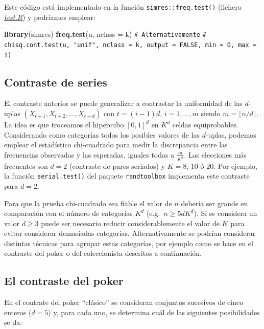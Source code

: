 \documentclass[
  spanish,
  10pt,
]{book}
\newenvironment{Shaded}{\begin{snugshade}}{\end{snugshade}}
\newcommand{\AttributeTok}[1]{\textcolor[rgb]{0.13,0.29,0.53}{#1}}
\newcommand{\CommentTok}[1]{\textcolor[rgb]{0.56,0.35,0.01}{\textit{#1}}}
\newcommand{\FunctionTok}[1]{\textcolor[rgb]{0.13,0.29,0.53}{\textbf{#1}}}
\newcommand{\NormalTok}[1]{#1}
\theoremstyle{break}
\theoremstyle{nonumberplain}
\renewcommand{\CommentTok}[1]{\textcolor[rgb]{0.41,0.41,0.41}{\texttt{#1}}}
\begin{document}
Este código está implementado en la función \texttt{simres::freq.test()} (fichero \href{R/test.R}{\emph{test.R}}) y podríamos emplear:

\begin{Shaded}
\begin{Highlighting}[]
\FunctionTok{library}\NormalTok{(simres)}
\FunctionTok{freq.test}\NormalTok{(u, }\AttributeTok{nclass =}\NormalTok{ k)}
\CommentTok{\# Alternativamente}
\CommentTok{\# chisq.cont.test(u, "unif", nclass = k, output = FALSE, min = 0, max = 1)}
\end{Highlighting}
\end{Shaded}

\subsection{Contraste de series}\label{contraste-de-series}

El contraste anterior se puede generalizar a contrastar la uniformidad de las \(d\)-uplas \((X_{t+1},X_{t+2},\ldots,X_{t+d})\) con \(t=(i-1)d\), \(i=1,\ldots,m\) siendo \(m=\lfloor n/d \rfloor\).
La idea es que troceamos el hipercubo \([0, 1]^d\) en \(K^d\) celdas equiprobables.
Considerando como categorías todos los posibles valores de las \(d\)-uplas, podemos emplear el estadístico chi-cuadrado para medir la discrepancia entre las frecuencias observadas y las esperadas, iguales todas a \(\frac{m}{K^d}\).
Las elecciones más frecuentes son \(d=2\) (contraste de pares seriados) y \(K=8\), \(10\) ó \(20\).
Por ejemplo, la función \texttt{serial.test()} del paquete \texttt{randtoolbox} implementa este contraste para \(d=2\).

Para que la prueba chi-cuadrado sea fiable el valor de \(n\) debería ser grande en comparación con el número de categorías \(K^d\) (e.g.~\(n \geq 5dK^d\)).
Si se considera un valor \(d \geq 3\) puede ser necesario reducir considerablemente el valor de \(K\) para evitar considerar demasiadas categorías.
Alternativamente se podrían considerar distintas técnicas para agrupar estas categorías, por ejemplo como se hace en el contraste del poker o del coleccionista descritos a continuación.

\subsection{El contraste del poker}\label{el-contraste-del-poker}

En el contrate del poker ``clásico'' se consideran conjuntos sucesivos de cinco enteros (\(d=5\)) y, para cada uno, se determina cuál de las siguientes posibilidades se da:
\end{document}
